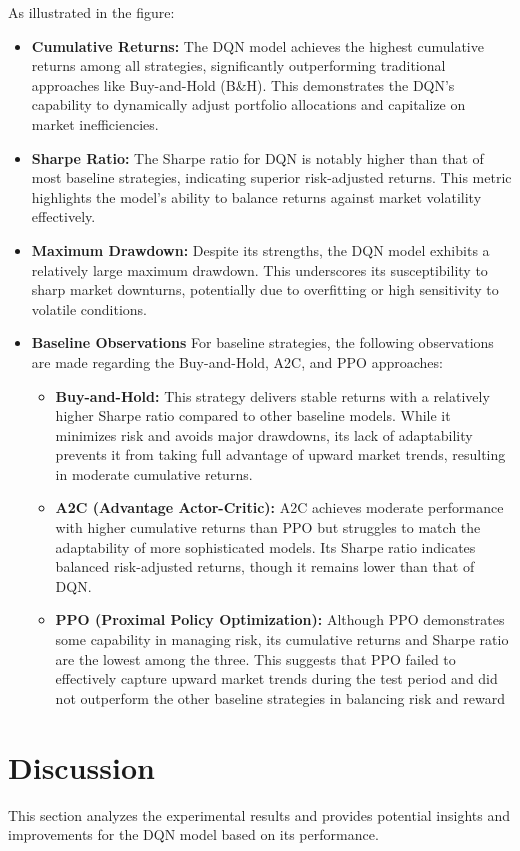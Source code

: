 \documentclass[conference]{IEEEtran}
\begin{document}
As illustrated in the figure:
\begin{itemize}
    \item \textbf{Cumulative Returns:} The DQN model achieves the highest cumulative returns among all strategies, significantly outperforming traditional approaches like Buy-and-Hold (B\&H). This demonstrates the DQN's capability to dynamically adjust portfolio allocations and capitalize on market inefficiencies.
    \item \textbf{Sharpe Ratio:} The Sharpe ratio for DQN is notably higher than that of most baseline strategies, indicating superior risk-adjusted returns. This metric highlights the model's ability to balance returns against market volatility effectively.
    \item \textbf{Maximum Drawdown:} Despite its strengths, the DQN model exhibits a relatively large maximum drawdown. This underscores its susceptibility to sharp market downturns, potentially due to overfitting or high sensitivity to volatile conditions.
    \item \textbf{Baseline Observations}
For baseline strategies, the following observations are made regarding the Buy-and-Hold, A2C, and PPO approaches:
\begin{itemize}
    \item \textbf{Buy-and-Hold:} This strategy delivers stable returns with a relatively higher Sharpe ratio compared to other baseline models. While it minimizes risk and avoids major drawdowns, its lack of adaptability prevents it from taking full advantage of upward market trends, resulting in moderate cumulative returns.
    \item \textbf{A2C (Advantage Actor-Critic):} A2C achieves moderate performance with higher cumulative returns than PPO but struggles to match the adaptability of more sophisticated models. Its Sharpe ratio indicates balanced risk-adjusted returns, though it remains lower than that of DQN.
    \item \textbf{PPO (Proximal Policy Optimization):} Although PPO demonstrates some capability in managing risk, its cumulative returns and Sharpe ratio are the lowest among the three. This suggests that PPO failed to effectively capture upward market trends during the test period and did not outperform the other baseline strategies in balancing risk and reward
\end{itemize}

\end{itemize}

\section{Discussion}
This section analyzes the experimental results and provides potential insights and improvements for the DQN model based on its performance.
\end{document}
